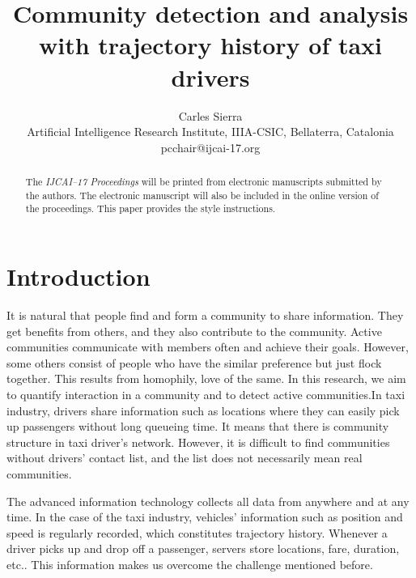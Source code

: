 \documentclass{article}
\title{Community detection and analysis with trajectory history of taxi drivers}
\author{Carles Sierra\\ 
Artificial Intelligence Research Institute, IIIA-CSIC, Bellaterra, Catalonia  \\
pcchair@ijcai-17.org}
\begin{document}
\maketitle

\begin{abstract}
  The {\it IJCAI--17 Proceedings} will be printed from electronic
  manuscripts submitted by the authors. The electronic manuscript will
  also be included in the online version of the proceedings. This paper
  provides the style instructions.
\end{abstract}

\section{Introduction}

It is natural that people find and form a community to share information. They get benefits from others, and they also contribute to the community. Active communities communicate with members often and achieve their goals. However, some others consist of people who have the similar preference but just flock together. This results from homophily, love of the same. In this research, we aim to quantify interaction in a community and to detect active communities.In taxi industry, drivers share information such as locations where they can easily pick up passengers without long queueing time. It means that there is community structure in taxi driver's network. However, it is difficult to find communities without drivers' contact list, and the list does not necessarily mean real communities.

The advanced information technology collects all data from anywhere and at any time. In the case of the taxi industry, vehicles' information such as position and speed is regularly recorded, which constitutes trajectory history. Whenever a driver picks up and drop off a passenger, servers store locations, fare, duration, etc.. This information makes us overcome the challenge mentioned before.
\end{document}
